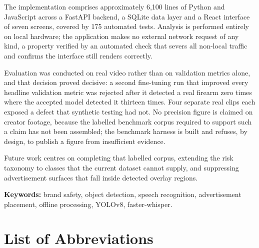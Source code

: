 \documentclass[
12pt,
a4paper,
oneside
]{report}
\begin{document}
The implementation comprises approximately 6{,}100 lines of Python and
JavaScript across a FastAPI backend, a SQLite data layer and a React interface
of seven screens, covered by 175 automated tests. Analysis is performed entirely
on local hardware; the application makes no external network request of any
kind, a property verified by an automated check that severs all non-local
traffic and confirms the interface still renders correctly.

Evaluation was conducted on real video rather than on validation metrics alone,
and that decision proved decisive: a second fine-tuning run that improved every
headline validation metric was rejected after it detected a real firearm zero
times where the accepted model detected it thirteen times. Four separate real
clips each exposed a defect that synthetic testing had not. No precision figure
is claimed on creator footage, because the labelled benchmark corpus required to
support such a claim has not been assembled; the benchmark harness is built and
refuses, by design, to publish a figure from insufficient evidence.

Future work centres on completing that labelled corpus, extending the risk
taxonomy to classes that the current dataset cannot supply, and suppressing
advertisement surfaces that fall inside detected overlay regions.

\vspace{0.4cm}
\noindent\textbf{Keywords:} brand safety, object detection, speech recognition,
advertisement placement, offline processing, YOLOv8, faster-whisper.

\newpage
\tableofcontents

\newpage
\listoffigures

\newpage
\listoftables

\newpage

\chapter*{List of Abbreviations}
\end{document}
